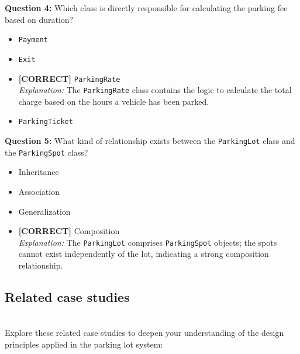 \vspace{0.3cm}
\noindent
\textbf{Question 4:} Which class is directly responsible for calculating the parking fee based on duration?
\\[0.2cm]
\begin{itemize}
 \item \texttt{Payment}
 \item \texttt{Exit}
 \item \textbf{[CORRECT]} \texttt{ParkingRate}
\\[0.1cm]
\textit{Explanation:} 
The \texttt{ParkingRate} class contains the logic to calculate the total charge based on the hours a vehicle has been parked.
 \item \texttt{ParkingTicket}
\end{itemize}
\vspace{0.3cm}
\noindent
\textbf{Question 5:} What kind of relationship exists between the \texttt{ParkingLot} class and the \texttt{ParkingSpot} class?
\\[0.2cm]
\begin{itemize}
 \item Inheritance
 \item Association
 \item Generalization
 \item \textbf{[CORRECT]} Composition
\\[0.1cm]
\textit{Explanation:} 
The \texttt{ParkingLot} comprises \texttt{ParkingSpot} objects; the spots cannot exist independently of the lot, indicating a strong composition relationship.
\end{itemize}

\subsection{Related case studies}\label{LQNaabpvsIjTl9sWj-xdA}
\\
Explore these related case studies to deepen your understanding of the design principles applied in the parking lot system:

